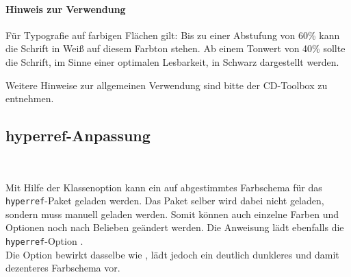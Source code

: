\paragraph{Hinweis zur Verwendung}

Für Typografie auf farbigen Flächen gilt:
Bis zu einer Abstufung von 60\% kann die Schrift in Weiß auf diesem Farbton stehen.
Ab einem Tonwert von 40\% sollte die Schrift,
im Sinne einer optimalen Lesbarkeit, in Schwarz dargestellt werden. 

Weitere Hinweise zur allgemeinen Verwendung sind bitte der
CD-Toolbox\cite{toolbox} zu entnehmen.

\subsection{hyperref-Anpassung}

\begin{Declaration}
  \\
\end{Declaration}

Mit Hilfe der Klassenoption  kann ein auf \tubslatex abgestimmtes
Farbschema für das \texttt{hyperref}-Paket geladen werden.
Das Paket selber wird dabei nicht geladen, sondern muss manuell geladen werden.
Somit können auch einzelne Farben und Optionen noch nach Belieben geändert werden.
Die Anweisung lädt ebenfalls die \texttt{hyperref}-Option .\\
Die Option  bewirkt dasselbe wie ,
lädt jedoch ein deutlich dunkleres und damit dezenteres Farbschema vor.









